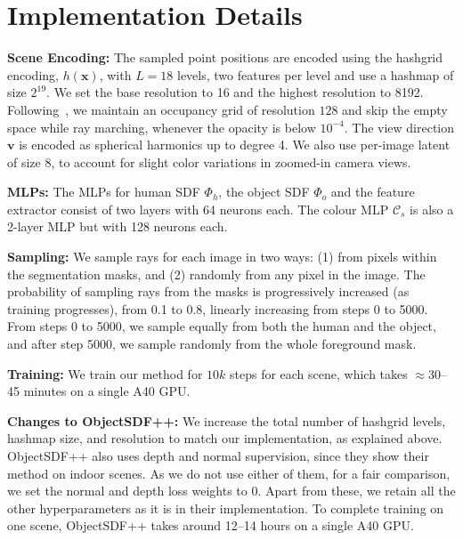 \section{Implementation Details}
\label{sec:implementation_details}
\noindent \textbf{Scene Encoding:} The sampled point positions are encoded using the hashgrid encoding, $h(\mathbf{x})$, with $L = 18$ levels, two features per level and use a hashmap of size $2^{19}$.
We set the base resolution to 16 and the highest resolution to 8192. Following~\cite{mueller2022instant}, we maintain an occupancy grid of resolution $128$ and skip the empty space while ray marching, whenever the opacity is below $10^{-4}$. The view direction $\mathbf{v}$ is encoded as spherical harmonics up to degree 4. We also use per-image latent of size 8, to account for slight color variations in zoomed-in camera views.
\par
\noindent \textbf{MLPs:} The MLPs for human SDF $\Phi_h$, the object SDF $\Phi_o$ and the feature extractor consist of two layers with 64 neurons each. The colour MLP $\mathcal{C}_s$ is also a 2-layer MLP but with 128 neurons each. 
\par \noindent \textbf{Sampling:} We sample rays for each image in two ways: (1) from pixels within the segmentation masks,  and (2) randomly from any pixel in the image. 
The probability of sampling rays from the masks is progressively increased (as training progresses), from 0.1 to 0.8, linearly increasing from steps 0 to 5000. From steps 0 to 5000, we sample equally from both the human and the object, and after step 5000, we sample randomly from the whole foreground mask.
\par \noindent \textbf{Training:} We train our method for $10k$ steps for each scene, which  takes $\approx$30--45 minutes on a single A40 GPU.
\par \noindent \textbf{Changes to ObjectSDF++:} We increase the total number of hashgrid levels, hashmap size, and resolution to match our implementation, as explained above. ObjectSDF++ also uses depth and normal supervision, since they show their method on indoor scenes. As we do not use either of them, for a fair comparison, we set the normal and depth loss weights to 0. Apart from these, we retain all the other hyperparameters as it is in their implementation. To complete training on one scene, ObjectSDF++ takes around 12--14 hours on a single A40 GPU.

